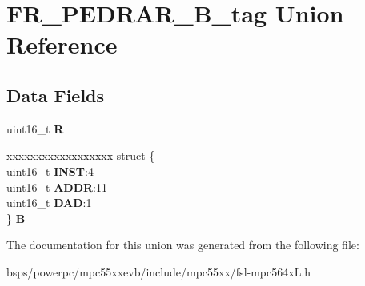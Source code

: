 \hypertarget{unionFR__PEDRAR__16B__tag}{}\section{F\+R\+\_\+\+P\+E\+D\+R\+A\+R\+\_\+B\+\_\+tag Union Reference}
\label{unionFR__PEDRAR__16B__tag}
\subsection*{Data Fields}
\begin{DoxyCompactItemize}
\item 
\mbox{\label{unionFR__PEDRAR__16B__tag_aee0c64338f7a3f930f970c4256075240}} 
uint16\+\_\+t {\bfseries R}
\item 
\mbox{\label{unionFR__PEDRAR__16B__tag_a121f0d47b99ac12a3903c19780934db5}} 
\begin{tabbing}
xx\=xx\=xx\=xx\=xx\=xx\=xx\=xx\=xx\=\kill
struct \{\\
\>uint16\_t {\bfseries INST}:4\\
\>uint16\_t {\bfseries ADDR}:11\\
\>uint16\_t {\bfseries DAD}:1\\
\} {\bfseries B}\\

\end{tabbing}\end{DoxyCompactItemize}


The documentation for this union was generated from the following file\+:\begin{DoxyCompactItemize}
\item 
bsps/powerpc/mpc55xxevb/include/mpc55xx/fsl-\/mpc564x\+L.\+h\end{DoxyCompactItemize}
